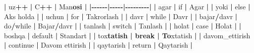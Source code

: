 \documentclass[a4paper,11pt,twoside,openright]{book}
\newenvironment{Shaded}{\begin{snugshade}}{\end{snugshade}}
\newcommand{\CharTok}[1]{\textcolor[rgb]{0.31,0.60,0.02}{#1}}
\newcommand{\ErrorTok}[1]{\textcolor[rgb]{0.64,0.00,0.00}{\textbf{#1}}}
\newcommand{\NormalTok}[1]{#1}
\newcommand{\OperatorTok}[1]{\textcolor[rgb]{0.81,0.36,0.00}{\textbf{#1}}}
\begin{document}
\begin{Shaded}
\begin{Highlighting}[]
\OperatorTok{|}\NormalTok{ uz}\OperatorTok{++} \OperatorTok{|}\NormalTok{ C}\OperatorTok{++} \OperatorTok{|}\NormalTok{ Ma}\CharTok{\textquotesingle{}n}\ErrorTok{osi |}
\OperatorTok{|{-}{-}{-}{-}{-}{-}|{-}{-}{-}{-}{-}|{-}{-}{-}{-}{-}{-}{-}{-}{-}|}
\OperatorTok{|} \ErrorTok{\textasciigrave{}}\NormalTok{agar}\ErrorTok{\textasciigrave{}} \OperatorTok{|} \ErrorTok{\textasciigrave{}}\NormalTok{if}\ErrorTok{\textasciigrave{}} \OperatorTok{|}\NormalTok{ Agar }\OperatorTok{|}
\OperatorTok{|} \ErrorTok{\textasciigrave{}}\NormalTok{yoki}\ErrorTok{\textasciigrave{}} \OperatorTok{|} \ErrorTok{\textasciigrave{}}\NormalTok{else}\ErrorTok{\textasciigrave{}} \OperatorTok{|}\NormalTok{ Aks holda }\OperatorTok{|}
\OperatorTok{|} \ErrorTok{\textasciigrave{}}\NormalTok{uchun}\ErrorTok{\textasciigrave{}} \OperatorTok{|} \ErrorTok{\textasciigrave{}}\NormalTok{for}\ErrorTok{\textasciigrave{}} \OperatorTok{|}\NormalTok{ Takrorlash }\OperatorTok{|}
\OperatorTok{|} \ErrorTok{\textasciigrave{}}\NormalTok{davr}\ErrorTok{\textasciigrave{}} \OperatorTok{|} \ErrorTok{\textasciigrave{}}\NormalTok{while}\ErrorTok{\textasciigrave{}} \OperatorTok{|}\NormalTok{ Davr }\OperatorTok{|}
\OperatorTok{|} \ErrorTok{\textasciigrave{}}\NormalTok{bajar}\ErrorTok{\textasciigrave{}}\OperatorTok{/}\ErrorTok{\textasciigrave{}}\NormalTok{davr}\ErrorTok{\textasciigrave{}} \OperatorTok{|} \ErrorTok{\textasciigrave{}}\NormalTok{do}\ErrorTok{\textasciigrave{}}\OperatorTok{/}\ErrorTok{\textasciigrave{}}\NormalTok{while}\ErrorTok{\textasciigrave{}} \OperatorTok{|}\NormalTok{ Bajar}\OperatorTok{/}\NormalTok{davr }\OperatorTok{|}
\OperatorTok{|} \ErrorTok{\textasciigrave{}}\NormalTok{tanlash}\ErrorTok{\textasciigrave{}} \OperatorTok{|} \ErrorTok{\textasciigrave{}}\NormalTok{switch}\ErrorTok{\textasciigrave{}} \OperatorTok{|}\NormalTok{ Tanlash }\OperatorTok{|}
\OperatorTok{|} \ErrorTok{\textasciigrave{}}\NormalTok{holat}\ErrorTok{\textasciigrave{}} \OperatorTok{|} \ErrorTok{\textasciigrave{}}\NormalTok{case}\ErrorTok{\textasciigrave{}} \OperatorTok{|}\NormalTok{ Holat }\OperatorTok{|}
\OperatorTok{|} \ErrorTok{\textasciigrave{}}\NormalTok{boshqa}\ErrorTok{\textasciigrave{}} \OperatorTok{|} \ErrorTok{\textasciigrave{}}\NormalTok{default}\ErrorTok{\textasciigrave{}} \OperatorTok{|}\NormalTok{ Standart }\OperatorTok{|}
\OperatorTok{|} \ErrorTok{\textasciigrave{}}\NormalTok{to}\CharTok{\textquotesingle{}x}\ErrorTok{tatish\textasciigrave{} | \textasciigrave{}break\textasciigrave{} | To}\CharTok{\textquotesingle{}}\NormalTok{xtatish }\OperatorTok{|}
\OperatorTok{|} \ErrorTok{\textasciigrave{}}\NormalTok{davom\_ettirish}\ErrorTok{\textasciigrave{}} \OperatorTok{|} \ErrorTok{\textasciigrave{}}\NormalTok{continue}\ErrorTok{\textasciigrave{}} \OperatorTok{|}\NormalTok{ Davom ettirish }\OperatorTok{|}
\OperatorTok{|} \ErrorTok{\textasciigrave{}}\NormalTok{qaytarish}\ErrorTok{\textasciigrave{}} \OperatorTok{|} \ErrorTok{\textasciigrave{}}\NormalTok{return}\ErrorTok{\textasciigrave{}} \OperatorTok{|}\NormalTok{ Qaytarish }\OperatorTok{|}


\end{Highlighting}
\end{Shaded}
\end{document}
